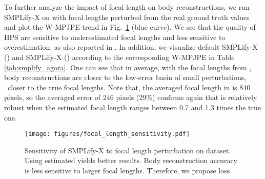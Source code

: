 \documentclass[10pt,twocolumn,letterpaper,usenames,dvipsnames]{article}
\begin{document}
To further analyze the impact of focal length on body reconstructions, we run SMPLify-X on \agoracam with focal lengths perturbed from the real ground truth values
and plot the W-MPJPE trend in Fig.~\ref{fig:f_sensitivity} (blue curve).
We see that the quality of HPS are sensitive to underestimated focal lengths and less sensitive to overestimation, as also reported in \cite{kissosECCVW2020,yu2020pcls}.
In addition, we visualize default SMPLify-X () and SMPLify-X (\camcalib ) according to the corresponding W-MPJPE in Table \ref{tab:smplify_agora}.
One can see that in average, with the focal lengths from \camcalib, body reconstructions are closer to the low-error basin of small perturbations, \ie~closer to the true focal lengths. 
Note that, the averaged focal length in \agoracam is 840 pixels, so the averaged error of 246 pixels (29\%) confirms again that \smplify is relatively robust when the estimated focal length ranges between 0.7 and 1.3 times the true one.
\begin{table}[]
    \centering
    \caption{{\bf HPS optimization with an estimated camera.}  \smplify on the \agoracam dataset.} \label{tab:smplify_agora}
\end{table} 
\begin{figure}
    \centering
    \texttt{[image: figures/focal\_length\_sensitivity.pdf]}
    \caption{Sensitivity of SMPLify-X to focal length perturbation on \agoracam dataset. Using \camcalib estimated  yields better results. Body reconstruction accuracy is less sensitive to larger focal lengths. Therefore, we propose \softbiasedltwo loss.}
    \label{fig:f_sensitivity}
\end{figure}
\end{document}

